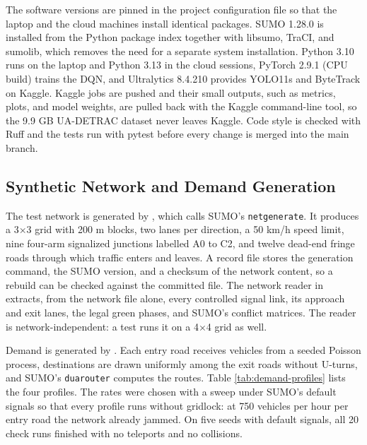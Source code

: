 The software versions are pinned in the project configuration file so that the laptop and the cloud machines install identical packages. SUMO 1.28.0 is installed from the Python package index together with libsumo, TraCI, and sumolib, which removes the need for a separate system installation. Python 3.10 runs on the laptop and Python 3.13 in the cloud sessions, PyTorch 2.9.1 (CPU build) trains the DQN, and Ultralytics 8.4.210 provides YOLO11s and ByteTrack on Kaggle. Kaggle jobs are pushed and their small outputs, such as metrics, plots, and model weights, are pulled back with the Kaggle command-line tool, so the 9.9 GB UA-DETRAC dataset never leaves Kaggle. Code style is checked with Ruff and the tests run with pytest before every change is merged into the main branch.

\subsection{Synthetic Network and Demand Generation}

The test network is generated by , which calls SUMO's \texttt{netgenerate}. It produces a 3$\times$3 grid with 200 m blocks, two lanes per direction, a 50 km/h speed limit, nine four-arm signalized junctions labelled A0 to C2, and twelve dead-end fringe roads through which traffic enters and leaves. A record file stores the generation command, the SUMO version, and a checksum of the network content, so a rebuild can be checked against the committed file. The network reader in  extracts, from the network file alone, every controlled signal link, its approach and exit lanes, the legal green phases, and SUMO's conflict matrices. The reader is network-independent: a test runs it on a 4$\times$4 grid as well.

Demand is generated by . Each entry road receives vehicles from a seeded Poisson process, destinations are drawn uniformly among the exit roads without U-turns, and SUMO's \texttt{duarouter} computes the routes. Table \ref{tab:demand-profiles} lists the four profiles. The rates were chosen with a sweep under SUMO's default signals so that every profile runs without gridlock: at 750 vehicles per hour per entry road the network already jammed. On five seeds with default signals, all 20 check runs finished with no teleports and no collisions.

